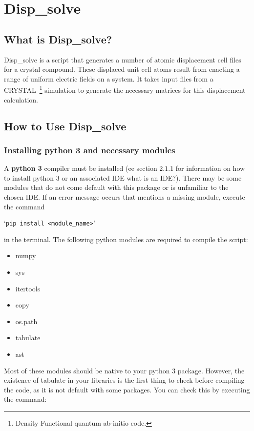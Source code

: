 \section{Disp\_solve}
\subsection{What is Disp\_solve?}
Disp\_solve is a script that generates a number of atomic displacement cell
files for a crystal compound. These displaced unit cell atoms result from
enacting a range of uniform electric fields on a system. It takes input files
from a CRYSTAL~\footnote{Density Functional quantum ab-initio code.}
simulation to generate the necessary matrices for this displacement
calculation.

\subsection{How to Use Disp\_solve}
\subsubsection{Installing python 3 and necessary modules}
A \textbf{python 3} compiler must be installed (ee section $2.1.1$ for
information on how to install python 3 or an associated IDE {\color{red} what
  is an IDE?}). There may be some modules that do not come default with this
package or is unfamiliar to the chosen IDE. If an error message occurs that
mentions a missing module, execute the command

`\texttt{pip install <module\_name>}'

in the terminal. The following python modules are required to compile
the script:
  \begin{itemize} \itemsep -0.5ex
 	\item numpy
 	\item sys
 	\item itertools
 	\item copy
 	\item os.path
 	\item tabulate
 	\item ast
 \end{itemize}

Most of these modules should be native to your python 3 package. However, the existence of tabulate in your libraries is the first thing to check before compiling the code, as it is not default with some packages. You can check this by executing the command:

